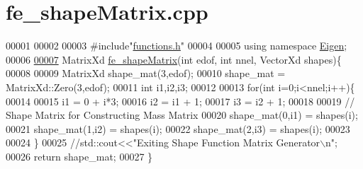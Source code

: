 \hypertarget{fe__shape_matrix_8cpp_source}{}\section{fe\+\_\+shape\+Matrix.\+cpp}
\label{fe__shape_matrix_8cpp_source}

\begin{DoxyCode}
00001 
00002 
00003 \textcolor{preprocessor}{#include"\hyperlink{functions_8h}{functions.h}"}
00004 
00005 \textcolor{keyword}{using namespace }\hyperlink{namespace_eigen}{Eigen};
00006 
\hyperlink{fe__shape_matrix_8cpp_a98fae74dde5fe33a7062e7457a2d3227}{00007} MatrixXd \hyperlink{fe__shape_matrix_8cpp_a98fae74dde5fe33a7062e7457a2d3227}{fe\_shapeMatrix}(\textcolor{keywordtype}{int} edof, \textcolor{keywordtype}{int} nnel, VectorXd shapes)\{
00008     
00009     MatrixXd shape\_mat(3,edof);
00010     shape\_mat = MatrixXd::Zero(3,edof);
00011     \textcolor{keywordtype}{int} i1,i2,i3;
00012 
00013     \textcolor{keywordflow}{for}(\textcolor{keywordtype}{int} i=0;i<nnel;i++)\{
00014         
00015         i1 = 0 + i*3;
00016         i2 = i1 + 1;
00017         i3 = i2 + 1;
00018         
00019         \textcolor{comment}{// Shape Matrix for Constructing Mass Matrix}
00020         shape\_mat(0,i1) = shapes(i);
00021         shape\_mat(1,i2) = shapes(i);
00022         shape\_mat(2,i3) = shapes(i);
00023 
00024     \}
00025     \textcolor{comment}{//std::cout<<"Exiting Shape Function Matrix Generator\(\backslash\)n";}
00026     \textcolor{keywordflow}{return} shape\_mat;
00027 \}
\end{DoxyCode}
